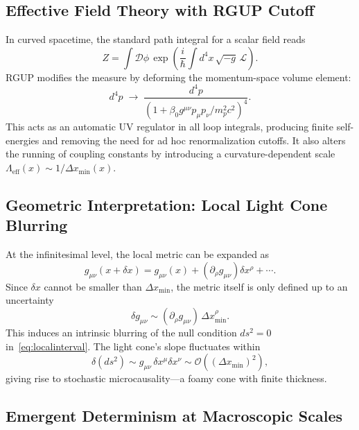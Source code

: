 \documentclass[11pt,oneside]{book}
\numberwithin{equation}{chapter}
\begin{document}
\subsection*{Effective Field Theory with RGUP Cutoff}

In curved spacetime, the standard path integral for a scalar field reads
\begin{equation}
Z = \int \mathcal{D}\phi\, 
\exp\!\left(
\frac{i}{\hbar}
\int d^4x\,\sqrt{-g}\,\mathcal{L}
\right).
\end{equation}
RGUP modifies the measure by deforming the momentum-space volume element:
\begin{equation}
d^4p \;\rightarrow\;
\frac{d^4p}{(1+\beta_0 g^{\mu\nu}p_\mu p_\nu/m_p^2 c^2)^4}.
\label{eq:measureRGUP}
\end{equation}
This acts as an automatic UV regulator in all loop integrals, producing finite self-energies and removing the need for ad hoc renormalization cutoffs.  
It also alters the running of coupling constants by introducing a curvature-dependent scale \( \Lambda_{\text{eff}}(x)\sim1/\Delta x_{\min}(x) \).

\subsection*{Geometric Interpretation: Local Light Cone Blurring}

At the infinitesimal level, the local metric can be expanded as
\begin{equation}
g_{\mu\nu}(x+\delta x) =
g_{\mu\nu}(x) + (\partial_\rho g_{\mu\nu})\delta x^\rho + \cdots.
\end{equation}
Since $\delta x$ cannot be smaller than $\Delta x_{\min}$, the metric itself is only defined up to an uncertainty
\begin{equation}
\delta g_{\mu\nu} \sim 
(\partial_\rho g_{\mu\nu})\,\Delta x_{\min}^\rho.
\label{eq:metricuncert}
\end{equation}
This induces an intrinsic blurring of the null condition $ds^2=0$ in~\eqref{eq:localinterval}.  
The light cone’s slope fluctuates within
\begin{equation}
\delta(ds^2) \sim g_{\mu\nu}\,\delta x^\mu \delta x^\nu
\sim \mathcal{O}((\Delta x_{\min})^2),
\end{equation}
giving rise to stochastic microcausality—a foamy cone with finite thickness.

\subsection*{Emergent Determinism at Macroscopic Scales}
\end{document}
